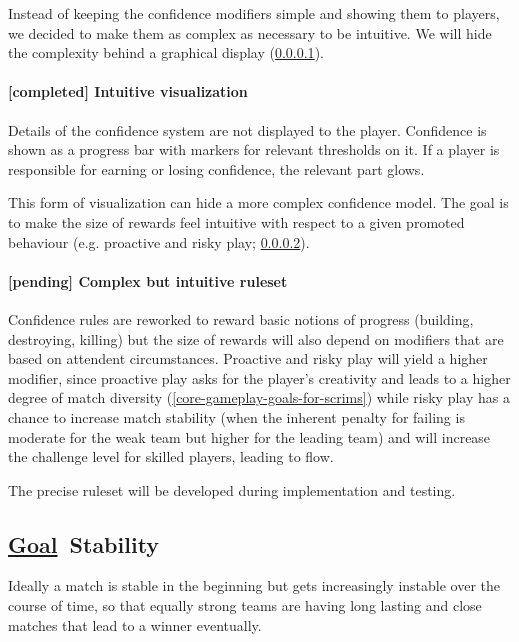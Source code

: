 \documentclass{scrartcl}
\newcommand{\goal}     [0]{\textbf{\underline{Goal}\ }}
\newcommand{\pending}  [0]{\textcolor{pending}  {\textbf{[pending] }}}
\newcommand{\completed}[0]{\textcolor{completed}{\textbf{[completed] }}}
\begin{document}
Instead of keeping the confidence modifiers simple and showing them to players, we decided to make them as complex as necessary to be intuitive. We will hide the complexity behind a graphical display (\ref{intuitive-visualization}).

\paragraph{\completed Intuitive visualization}
\label{intuitive-visualization}

Details of the confidence system are not displayed to the player. Confidence is shown as a progress bar with markers for relevant thresholds on it. If a player is responsible for earning or losing confidence, the relevant part glows.

This form of visualization can hide a more complex confidence model. The goal is to make the size of rewards feel intuitive with respect to a given promoted behaviour (e.g. proactive and risky play; \ref{complex-but-intuitive-ruleset}).

\paragraph{\pending Complex but intuitive ruleset}
\label{complex-but-intuitive-ruleset}

Confidence rules are reworked to reward basic notions of progress (building, destroying, killing) but the size of rewards will also depend on modifiers that are based on attendent circumstances. Proactive and risky play will yield a higher modifier, since proactive play asks for the player's creativity and leads to a higher degree of match diversity (\ref{core-gameplay-goals-for-scrims}) while risky play has a chance to increase match stability (when the inherent penalty for failing is moderate for the weak team but higher for the leading team) and will increase the challenge level for skilled players, leading to flow.

The precise ruleset will be developed during implementation and testing.

\subsection{\goal Stability}
\label{stability}

Ideally a match is stable in the beginning but gets increasingly instable over the course of time, so that equally strong teams are having long lasting and close matches that lead to a winner eventually.
\end{document}

